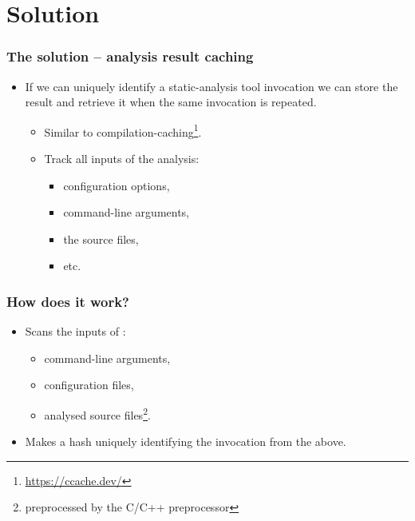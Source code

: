 \documentclass[compress,table,xcolor=table]{beamer}
\begin{document}
\section{Solution}
\begin{frame}
  \Huge
\end{frame}
\begin{frame}
  \frametitle{The solution -- analysis result caching}
    \Large
    \begin{itemize}
    \item If we can uniquely identify a static-analysis tool invocation
        we can store the result and retrieve it when the same invocation
        is repeated.
        \begin{itemize}
        \item Similar to compilation-caching\footnote{
            \url{https://ccache.dev/}}.
        \item Track all inputs of the analysis:
            \begin{itemize}
            \large
            \item configuration options,
            \item command-line arguments,
            \item the source files,
            \item etc.
            \end{itemize}
        \end{itemize}
    \end{itemize}
\end{frame}
\begin{frame}
    \Huge
\end{frame}
\begin{frame}
  \frametitle{How does it work?}
    \LARGE
    \begin{itemize}
        \item Scans the inputs of :
        \begin{itemize}
            \Large
            \item command-line arguments,
            \item configuration files,
            \item analysed source files\footnote{preprocessed by the C/C++
                preprocessor}.
        \end{itemize}
        \item Makes a hash uniquely identifying the invocation from
            the above.
    \end{itemize}
\end{frame}
\end{document}
